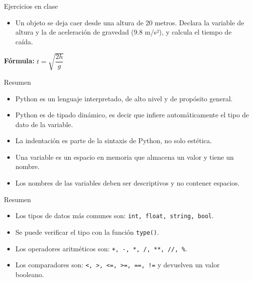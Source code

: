 \documentclass{beamer}
\begin{document}
    \begin{frame}[fragile,t]{Ejercicios en clase}
        \begin{itemize}
            \item Un objeto se deja caer desde una altura de 20 metros. Declara la variable de altura y la de aceleración de gravedad (9.8 m/s²), y calcula el tiempo de caída.
        \end{itemize}
        \textbf{Fórmula:}
        $t = \sqrt{\dfrac{2h}{g}}$
    \end{frame}

    \begin{frame}{Resumen}
        \begin{itemize}
            \item Python es un lenguaje interpretado, de alto nivel y de propósito general.
            \item Python es de tipado dinámico, es decir que infiere automáticamente el tipo de dato de la variable.
            \item La indentación es parte de la sintaxis de Python, no solo estética.
            \item Una variable es un espacio en memoria que almacena un valor y tiene un nombre.
            \item Los nombres de las variables deben ser descriptivos y no contener espacios.
        \end{itemize}
    \end{frame}

    \begin{frame}[fragile, t]{Resumen}
        \begin{itemize}
            \item Los tipos de datos más comunes son: \texttt{int, float, string, bool}.
            \item Se puede verificar el tipo con la función \texttt{type()}.
            \item Los operadores aritméticos son: \texttt{+, -, *, /, **, //, \%}.
            \item Los comparadores son: \texttt{<, >, <=, >=, ==, !=} y devuelven un valor booleano.
        \end{itemize}
    \end{frame}

\end{document}
